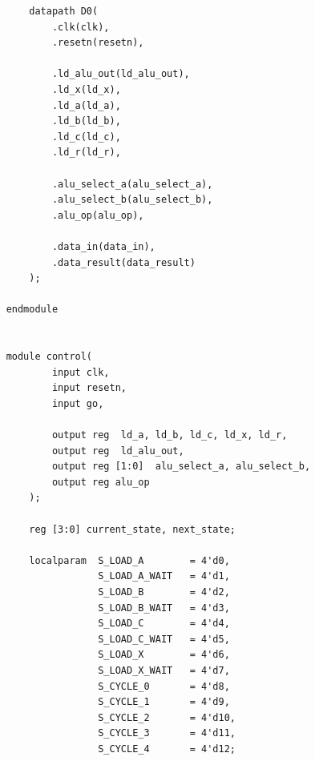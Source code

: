 \documentclass{article}
\begin{document}
\begin{verbatim}
        datapath D0(
            .clk(clk),
            .resetn(resetn),

            .ld_alu_out(ld_alu_out), 
            .ld_x(ld_x),
            .ld_a(ld_a),
            .ld_b(ld_b),
            .ld_c(ld_c), 
            .ld_r(ld_r), 

            .alu_select_a(alu_select_a),
            .alu_select_b(alu_select_b),
            .alu_op(alu_op),

            .data_in(data_in),
            .data_result(data_result)
        );
                    
    endmodule        
                    

    module control(
            input clk,
            input resetn,
            input go,

            output reg  ld_a, ld_b, ld_c, ld_x, ld_r,
            output reg  ld_alu_out,
            output reg [1:0]  alu_select_a, alu_select_b,
            output reg alu_op
        );

        reg [3:0] current_state, next_state; 
        
        localparam  S_LOAD_A        = 4'd0,
                    S_LOAD_A_WAIT   = 4'd1,
                    S_LOAD_B        = 4'd2,
                    S_LOAD_B_WAIT   = 4'd3,
                    S_LOAD_C        = 4'd4,
                    S_LOAD_C_WAIT   = 4'd5,
                    S_LOAD_X        = 4'd6,
                    S_LOAD_X_WAIT   = 4'd7,
                    S_CYCLE_0       = 4'd8,
                    S_CYCLE_1       = 4'd9,
                    S_CYCLE_2       = 4'd10,
                    S_CYCLE_3       = 4'd11,
                    S_CYCLE_4       = 4'd12;
        

\end{verbatim}
\end{document}
